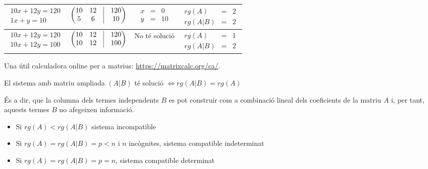\documentclass{beamer}
\begin{document}
\begin{frame}
\begin{tabular}{|c|c|c|c|}
    \\
    \hline
    $\begin{array}{c}10x+12y=120\\1x+y=10\end{array}$&
    $\begin{pmatrix}10&12&\vrule&120\\5&6&\vrule&10\end{pmatrix}$&
    $\begin{array}{rcl}x&=&0\\y&=&10\end{array}$&
    $\begin{array}{rcl}rg(A)&=&2\\rg(A|B)&=&2\end{array}$
    \\
    \hline
    $\begin{array}{c}10x+12y=120\\10x+12y=100\end{array}$&
    $\begin{pmatrix}10&12&\vrule&120\\10&12&\vrule&100\end{pmatrix}$&
    No té solució&
    $\begin{array}{rcl}rg(A)&=&1\\rg(A|B)&=&2\end{array}$
    \\
    \hline
  \end{tabular}
  \normalsize
  Una útil calculadora online per a matrius: \url{https://matrixcalc.org/ca/}.
\end{frame}
\begin{frame}
  \begin{teorema}
    El sistema amb matriu ampliada $(A|B)$ té solució $\Leftrightarrow rg(A|B)=rg(A)$
  \end{teorema}
  És a dir, que la columna dels termes independents $B$ es pot construir com a combinació lineal dels coeficients de la matriu $A$ i, per tant, aquests termes $B$ no afegeixen informació.
  \begin{itemize}
    \item Si $rg(A)<rg(A|B)$ sistema incompatible
    \item Si $rg(A)=rg(A|B)=p<n$ i $n$ incògnites, sistema compatible indeterminat
    \item Si $rg(A)=rg(A|B)=p=n$, sistema compatible determinat
  \end{itemize}
\end{frame}
\end{document}

